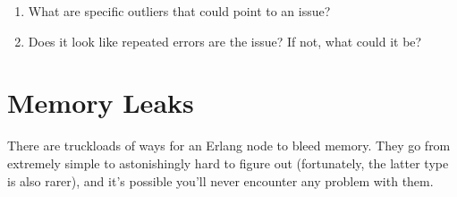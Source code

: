 \documentclass[11pt, oneside]{book}   	%
\begin{document}
\begin{enumerate}
	\item What are specific outliers that could point to an issue?
	\item Does it look like repeated errors are the issue? If not, what could it be? 
\end{enumerate}




\chapter{Memory Leaks}
\label{chap:memory-leaks}

There are truckloads of ways for an Erlang node to bleed memory. They go from extremely simple to astonishingly hard to figure out (fortunately, the latter type is also rarer), and it's possible you'll never encounter any problem with them.
\end{document}
